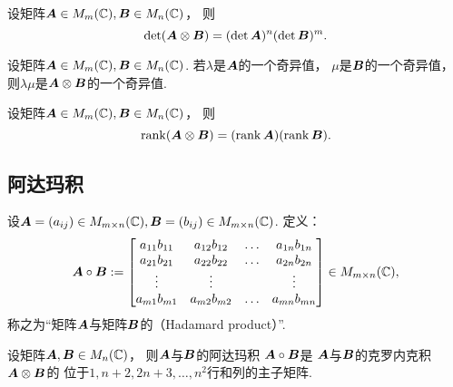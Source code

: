 \begin{property}
设矩阵\(\boldsymbol{A} \in M_m(\mathbb{C}),
\boldsymbol{B} \in M_n(\mathbb{C})\)，
则\begin{equation}
	\det(
		\boldsymbol{A}\otimes\boldsymbol{B}
	)
	= (\det\boldsymbol{A})^n (\det\boldsymbol{B})^m.
\end{equation}
\end{property}

\begin{property}
设矩阵\(\boldsymbol{A} \in M_m(\mathbb{C}),
\boldsymbol{B} \in M_n(\mathbb{C})\).
若\(\lambda\)是\(\boldsymbol{A}\)的一个奇异值，
\(\mu\)是\(\boldsymbol{B}\)的一个奇异值，
则\(\lambda\mu\)是\(\boldsymbol{A}\otimes\boldsymbol{B}\)的一个奇异值.
\end{property}

\begin{property}
设矩阵\(\boldsymbol{A} \in M_m(\mathbb{C}),
\boldsymbol{B} \in M_n(\mathbb{C})\)，
则\begin{equation}
	\rank(
		\boldsymbol{A}\otimes\boldsymbol{B}
	)
	= (\rank\boldsymbol{A}) (\rank\boldsymbol{B}).
\end{equation}
\end{property}

\subsection{阿达玛积}
\begin{definition}
设\(\boldsymbol{A} = (a_{ij}) \in M_{m \times n}(\mathbb{C}),
\boldsymbol{B} = (b_{ij}) \in M_{m \times n}(\mathbb{C})\).
定义：\begin{equation}
	\boldsymbol{A}\circ\boldsymbol{B}
	:=
	\begin{bmatrix}
		a_{11} b_{11} & a_{12} b_{12} & \dots & a_{1n} b_{1n} \\
		a_{21} b_{21} & a_{22} b_{22} & \dots & a_{2n} b_{2n} \\
		\vdots & \vdots & & \vdots \\
		a_{m1} b_{m1} & a_{m2} b_{m2} & \dots & a_{mn} b_{mn}
	\end{bmatrix}
	\in M_{m \times n}(\mathbb{C}),
\end{equation}
称之为“矩阵\(\boldsymbol{A}\)与矩阵\(\boldsymbol{B}\)的（Hadamard product）”.
\end{definition}

\begin{lemma}
设矩阵\(\boldsymbol{A},\boldsymbol{B} \in M_n(\mathbb{C})\)，
则\(\boldsymbol{A}\)与\(\boldsymbol{B}\)的阿达玛积
\(\boldsymbol{A}\circ\boldsymbol{B}\)是
\(\boldsymbol{A}\)与\(\boldsymbol{B}\)的克罗内克积
\(\boldsymbol{A}\otimes\boldsymbol{B}\)的
位于\(1,n+2,2n+3,\dotsc,n^2\)行和列的主子矩阵.
\end{lemma}

